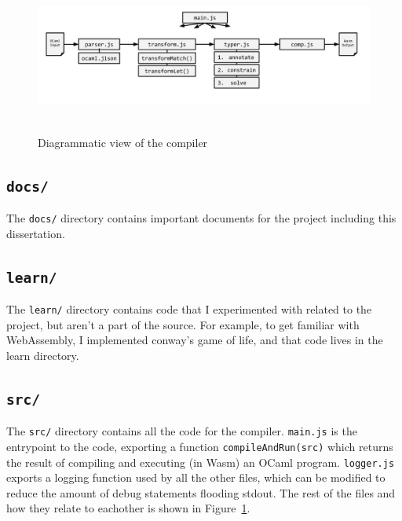 \documentclass[12pt,a4paper,twoside,openright]{report}
\begin{document}
\begin{figure}[tbh]
\centerline{\includegraphics[height=2in]{pipeline}}
\caption{Diagrammatic view of the compiler}
\label{pipeline}
\end{figure}

\subsection*{{\tt docs/}}
The {\tt docs/} directory contains important documents for the project including this dissertation.

\subsection*{{\tt learn/}}
The {\tt learn/} directory contains code that I experimented with related to the project, but aren't a part of the source.
For example, to get familiar with WebAssembly, I implemented conway's game of life, and that code lives in the learn directory.

\subsection*{{\tt src/}}
The {\tt src/} directory contains all the code for the compiler.
{\tt main.js} is the entrypoint to the code, exporting a function {\tt compileAndRun(src)} which returns the result of compiling and executing (in Wasm) an OCaml program.
{\tt logger.js} exports a logging function used by all the other files, which can be modified to reduce the amount of debug statements flooding stdout.
The rest of the files and how they relate to eachother is shown in Figure~\ref{pipeline}.
\end{document}
